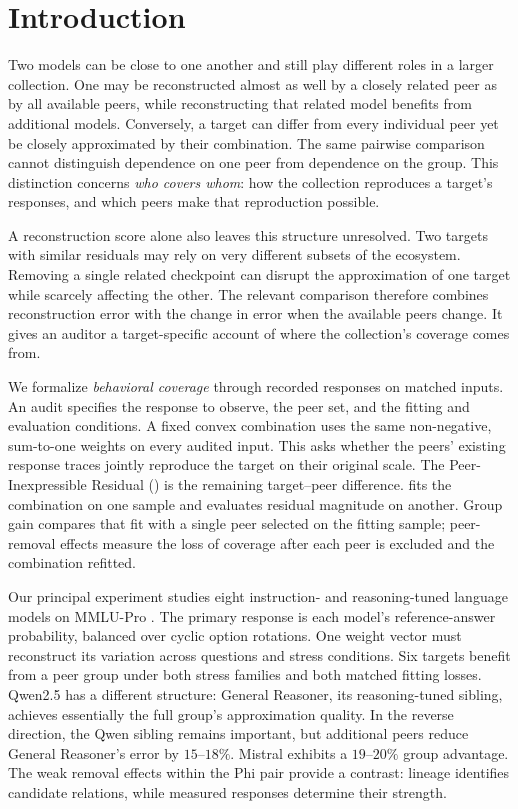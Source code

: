 \section{Introduction}
\label{sec:introduction}

Two models can be close to one another and still play different roles in a larger collection. One may be reconstructed almost as well by a closely related peer as by all available peers, while reconstructing that related model benefits from additional models. Conversely, a target can differ from every individual peer yet be closely approximated by their combination. The same pairwise comparison cannot distinguish dependence on one peer from dependence on the group. This distinction concerns \emph{who covers whom}: how the collection reproduces a target's responses, and which peers make that reproduction possible.

A reconstruction score alone also leaves this structure unresolved. Two targets with similar residuals may rely on very different subsets of the ecosystem. Removing a single related checkpoint can disrupt the approximation of one target while scarcely affecting the other. The relevant comparison therefore combines reconstruction error with the change in error when the available peers change. It gives an auditor a target-specific account of where the collection's coverage comes from.

We formalize \emph{behavioral coverage} through recorded responses on matched inputs. An audit specifies the response to observe, the peer set, and the fitting and evaluation conditions. A fixed convex combination uses the same non-negative, sum-to-one weights on every audited input. This asks whether the peers' existing response traces jointly reproduce the target on their original scale. The Peer-Inexpressible Residual (\PIER) is the remaining target--peer difference. \DISCO fits the combination on one sample and evaluates residual magnitude on another. Group gain compares that fit with a single peer selected on the fitting sample; peer-removal effects measure the loss of coverage after each peer is excluded and the combination refitted.

Our principal experiment studies eight instruction- and reasoning-tuned language models on MMLU-Pro \citep{wang2024mmlupro}. The primary response is each model's reference-answer probability, balanced over cyclic option rotations. One weight vector must reconstruct its variation across questions and stress conditions. Six targets benefit from a peer group under both stress families and both matched fitting losses. Qwen2.5 has a different structure: General Reasoner, its reasoning-tuned sibling, achieves essentially the full group's approximation quality. In the reverse direction, the Qwen sibling remains important, but additional peers reduce General Reasoner's error by $15$--$18\%$. Mistral exhibits a $19$--$20\%$ group advantage. The weak removal effects within the Phi pair provide a contrast: lineage identifies candidate relations, while measured responses determine their strength.

